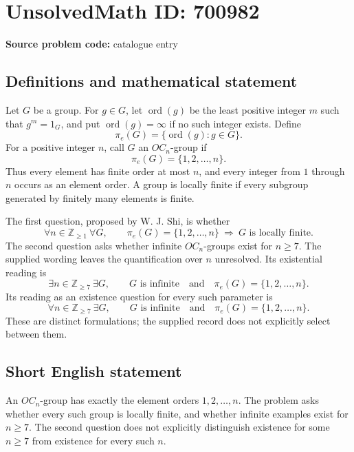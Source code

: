 \documentclass[11pt]{article}
\newcommand{\Z}{\mathbb{Z}}
\begin{document}
\section*{UnsolvedMath ID: 700982}
\textbf{Source problem code:} catalogue entry
\subsection{Definitions and mathematical statement}
Let \(G\) be a group. For \(g\in G\), let \(\operatorname{ord}(g)\) be the least positive integer \(m\) such that \(g^m=1_G\), and put \(\operatorname{ord}(g)=\infty\) if no such integer exists. Define
\[
\pi_e(G)=\{\operatorname{ord}(g):g\in G\}.
\]
For a positive integer \(n\), call \(G\) an \(OC_n\)-group if
\[
\pi_e(G)=\{1,2,\ldots,n\}.
\]
Thus every element has finite order at most \(n\), and every integer from \(1\) through \(n\) occurs as an element order. A group is locally finite if every subgroup generated by finitely many elements is finite.

The first question, proposed by W. J. Shi, is whether
\[
\forall n\in\Z_{\geq1}\ \forall G,\qquad
\pi_e(G)=\{1,2,\ldots,n\}
\ \Longrightarrow\ G\text{ is locally finite}.
\]
The second question asks whether infinite \(OC_n\)-groups exist for \(n\geq7\). The supplied wording leaves the quantification over \(n\) unresolved. Its existential reading is
\[
\exists n\in\Z_{\geq7}\ \exists G,\qquad
G\text{ is infinite}\quad\text{and}\quad
\pi_e(G)=\{1,2,\ldots,n\}.
\]
Its reading as an existence question for every such parameter is
\[
\forall n\in\Z_{\geq7}\ \exists G,\qquad
G\text{ is infinite}\quad\text{and}\quad
\pi_e(G)=\{1,2,\ldots,n\}.
\]
These are distinct formulations; the supplied record does not explicitly select between them.
\subsection{Short English statement}
An \(OC_n\)-group has exactly the element orders \(1,2,\ldots,n\). The problem asks whether every such group is locally finite, and whether infinite examples exist for \(n\geq7\). The second question does not explicitly distinguish existence for some \(n\geq7\) from existence for every such \(n\).
\end{document}
